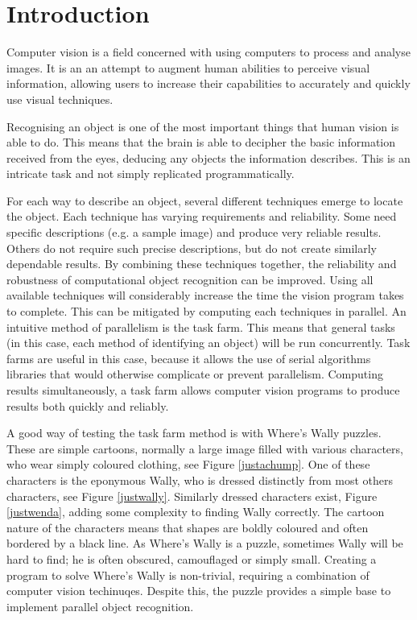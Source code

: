 \documentclass[../main.tex]{subfiles}
\begin{document}
  \section{Introduction}
    Computer vision is a field concerned with using computers to process and analyse images. 
    It is an an attempt to augment human abilities to perceive visual information,
      allowing users to increase their capabilities to accurately and quickly use visual techniques. %

    Recognising an object is one of the most important things that human vision is able to do.
    This means that the brain is able to decipher the basic information received from the eyes, deducing any objects the information describes.
    This is an intricate task and not simply replicated programmatically.

    For each way to describe an object, several different techniques emerge to locate the object.
    Each technique has varying requirements and reliability.
    Some need specific descriptions (e.g. a sample image) and produce very reliable results.
    Others do not require such precise descriptions, but do not create similarly dependable results.
    By combining these techniques together, the reliability and robustness of computational object recognition can be improved.
    Using all available techniques will considerably increase the time the vision program takes to complete.
    This can be mitigated by computing each techniques in parallel.
    An intuitive method of parallelism is the task farm.
    This means that general tasks (in this case, each method of identifying an object) will be run concurrently.
    Task farms are useful in this case, because it allows the use of serial algorithms libraries that would otherwise complicate or prevent parallelism.
    Computing results simultaneously, a task farm allows computer vision programs to produce results both quickly and reliably.

    A good way of testing the task farm method is with Where's Wally puzzles.
    These are simple cartoons, normally a large image filled with various characters, who wear simply coloured clothing, see Figure \ref{justachump}.
    One of these characters is the eponymous Wally, who is dressed distinctly from most others characters, see Figure \ref{justwally}.
    Similarly dressed characters exist, Figure \ref{justwenda}, adding some complexity to finding Wally correctly.
    The cartoon nature of the characters means that shapes are boldly coloured and often bordered by a black line.
    As Where's Wally is a puzzle, sometimes Wally will be hard to find; he is often obscured, camouflaged or simply small.
    Creating a program to solve Where's Wally is non-trivial, requiring a combination of computer vision techinuqes.
    Despite this, the puzzle provides a simple base to implement parallel object recognition.
\end{document}
